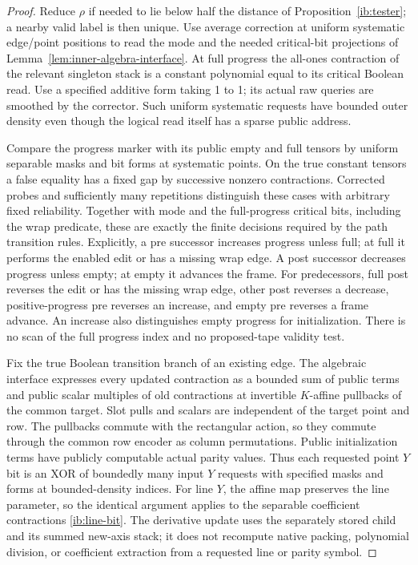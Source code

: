 \begin{proof}
Reduce \(\rho\) if needed to lie below half the distance of
Proposition~\ref{ib:tester}; a nearby valid label is then unique.
Use average correction at uniform systematic edge/point positions
to read the mode and the needed critical-bit projections of
Lemma~\ref{lem:inner-algebra-interface}.  At full progress the
all-ones contraction of the relevant singleton stack is a constant
polynomial equal to its critical Boolean read.  Use a specified
additive form taking 1 to 1; its actual raw queries are smoothed by
the corrector.  Such uniform systematic requests have bounded
outer density even though the logical read itself has a sparse
public address.

Compare the progress marker with its public empty and full tensors
by uniform separable masks and bit forms at systematic points.
On the true constant tensors a false equality has a fixed gap by
successive nonzero contractions.  Corrected probes and sufficiently
many repetitions distinguish these cases with arbitrary fixed
reliability.  Together with mode and the full-progress critical
bits, including the wrap predicate, these are exactly the finite
decisions required by the path transition rules.  Explicitly, a
pre successor increases progress unless full; at full it performs
the enabled edit or has a missing wrap edge.  A post successor
decreases progress unless empty; at empty it advances the frame.
For predecessors, full post reverses the edit or has the missing
wrap edge, other post reverses a decrease, positive-progress pre
reverses an increase, and empty pre reverses a frame advance.
An increase also distinguishes empty progress for initialization.
There is no scan of the full progress index and no proposed-tape
validity test.

Fix the true Boolean transition branch of an existing edge.  The
algebraic interface expresses every updated contraction as a
bounded sum of public terms and public scalar multiples of old
contractions at invertible \(K\)-affine pullbacks of the common
target.  Slot pulls and scalars are independent of the target point
and row.  The pullbacks commute with the rectangular action, so
they commute through the common row encoder as column permutations.
Public initialization terms have publicly computable actual
parity values.  Thus each requested point \(Y\) bit is an XOR
of boundedly many input \(Y\) requests with specified masks and
forms at bounded-density indices.  For line \(Y\), the affine
map preserves the line parameter, so the identical argument applies
to the separable coefficient contractions
\eqref{ib:line-bit}.  The derivative update uses the separately
stored child and its summed new-axis stack; it does not recompute
native packing, polynomial division, or coefficient extraction
from a requested line or parity symbol.


\end{proof}
